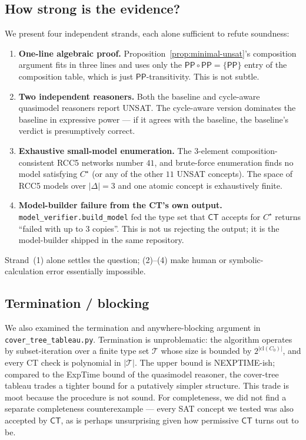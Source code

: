 \documentclass[]{ceurart}
\newcommand{\PP}{\mathsf{PP}}
\newcommand{\comp}{\circ}
\newcommand{\Cl}{\mathrm{cl}}
\theoremstyle{definition}
\theoremstyle{remark}
\begin{document}
\subsection{How strong is the evidence?}

We present four independent strands, each alone sufficient to refute
soundness:
\begin{enumerate}
  \item \textbf{One-line algebraic proof.}
    Proposition~\ref{prop:minimal-unsat}'s composition argument fits
    in three lines and uses only the $\PP \comp \PP = \{\PP\}$ entry
    of the composition table, which is just $\PP$-transitivity.
    This is not subtle.
  \item \textbf{Two independent reasoners.} Both the baseline and
    cycle-aware quasimodel reasoners report UNSAT.  The cycle-aware
    version dominates the baseline in expressive power --- if it
    agrees with the baseline, the baseline's verdict is presumptively
    correct.
  \item \textbf{Exhaustive small-model enumeration.}  The
    $3$-element composition-consistent RCC5 networks number $41$, and
    brute-force enumeration finds no model satisfying $C^{\star}$
    (or any of the other $11$ UNSAT concepts). The space of RCC5
    models over $|\Delta| = 3$ and one atomic concept is
    exhaustively finite.
  \item \textbf{Model-builder failure from the CT's own output.}
    \verb|model_verifier.build_model| fed the type set that
    $\mathsf{CT}$ accepts for $C^{\star}$ returns ``failed with up
    to $3$ copies''.  This is not us rejecting the output; it is the
    model-builder shipped in the same repository.
\end{enumerate}

Strand~(1) alone settles the question;  (2)--(4) make human or
symbolic-calculation error essentially impossible.

\subsection{Termination / blocking}

We also examined the termination and anywhere-blocking argument in
\verb|cover_tree_tableau.py|. Termination is unproblematic: the
algorithm operates by subset-iteration over a finite type set
$\mathcal{T}$ whose size is bounded by $2^{|\Cl(C_0)|}$, and every CT
check is polynomial in $|\mathcal{T}|$.  The upper bound is
NEXPTIME-ish; compared to the ExpTime bound of the quasimodel
reasoner, the cover-tree tableau trades a tighter bound for a
putatively simpler structure. This trade is moot because the procedure
is not sound. For completeness, we did not find a separate
completeness counterexample --- every SAT concept we tested was also
accepted by $\mathsf{CT}$, as is perhaps unsurprising given how
permissive $\mathsf{CT}$ turns out to be.
\end{document}
